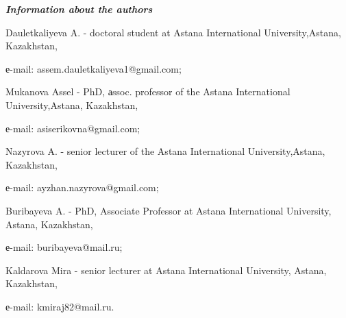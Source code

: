 \emph{{\bfseries Information about the authors}}

\begin{noparindent}
Dauletkaliyeva A. - doctoral student at Astana International
University,Astana, Kazakhstan,

е-mail: assem.dauletkaliyeva1@gmail.com;

Mukanova Assel - PhD, аssoc. professor of the Astana International
University,Astana, Kazakhstan,

е-mail: asiserikovna@gmail.com;

Nazyrova A. - senior lecturer of the Astana International
University,Astana, Kazakhstan,

е-mail: ayzhan.nazyrova@gmail.com;

Buribayeva A. - PhD, Associate Professor at Astana International
University, Astana, Kazakhstan,

е-mail: buribayeva@mail.ru;

Kaldarova Mira - senior lecturer at Astana International University,
Astana, Kazakhstan,

е-mail: kmiraj82@mail.ru.
\end{noparindent}

